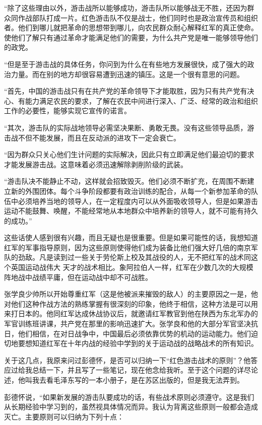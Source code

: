 \documentclass[10pt]{book}
\begin{document}
“除了这些理由以外，游击战所以能够成功，游击队所以能够战无不胜，还因为群众同作战部队打成一片。红色游击队不仅是战士，他们同时也是政治宣传员和组织者。他们到哪儿就把革命的思想带到哪儿，向农民群众耐心解释红军的真正使命。使他们了解只有通过革命才能满足他们的需要，为什么共产党是唯一能够领导他们的政党。

“但是至于游击战的具体任务，你问到为什么在有些地方发展很快，成了强大的政治力量。而在别的地方却很容易遭到迅速的镇压。这是一个很有意思的问题。

“首先，中国的游击战只有在共产党的革命领导下才能取胜，因为只有共产党有决心、有能力满足农民的要求，了解在农民中间进行深入、广泛、经常的政治和组织工作的必要性，能够实现它宣传的诺言。

“其次，游击队的实际战地领导必需坚决果断、勇敢无畏。没有这些领导品质，游击战不但不能发展，而且在反动派的进攻下一定会衰亡。

“因为群众只关心他们生计问题的实际解决，因此只有立即满足他们最迫切的要求才能发展游击战。这意味着必须迅速解除剥削阶级的武装。

“游击队决不能静止不动，这样就会招致毁灭。他们必须不断扩充，在周围不断建立新的外围团体。每个斗争阶段都要有政治训练的配合，从每一个新参加革命的队伍中必须培养当地的领导人，在一定程度内可以从外面吸收领导人，但是如果游击运动不能鼓舞、唤醒，不能经常地从本地群众中培养新的领导人，就不可能有持久的成功。”

这些话使人感到很有兴趣，而且无疑也是很重要。但是如果可能性的话，我想知道红军的军事指导原则，因为这些原则使得他们成为装备比他们强大好几倍的南京军队的劲敌。凡是读到过一些关于劳伦斯上校及其战役的人，无不把红军的战术同这个英国运动战伟大 天才的战术相比。象阿拉伯人一样，红军在少数几次的大规模阵地战中战绩平庸，但在运动战中却不可战胜。

张学良少帅所以开始尊重红军（这是他被派来摧毁的敌人）的主要原因之一是，他对他们这种作战方法的熟练掌握有很深刻的印象，他终于相信，这种方法是可以用来打日本的。他同红军达成休战协议后，就邀请红军教官到他在陕西为东北军办的军官训练班讲课，共产党在那里的影响迅速扩大。张学良和他的大部分军官坚决抗日，他们相信，在对日战争中，中国最后必须依靠优势的机动的运动能力。他们迫切地要想知道红军在十年内战的经验中学到的关于运动战的战略战术的所有知识。

关于这几点，我原来问过彭德怀，是否可以归纳一下“红色游击战术的原则”？他答应过给我总结一下，并且写了一些笔记，现在他念给我听。至于这个问题的详尽论述，他叫我去看毛泽东写的一本小册子，是在苏区出版的，但是我无法弄到。

彭德怀说，“如果新发展的游击队要成功的话，有些战术原则必须遵守。这是我们从长期经验中学习到的，虽然视具体情况而异。我认为背离这些原则一般都会造成灭亡。主要原则可以归纳为下列十点：
\end{document}
